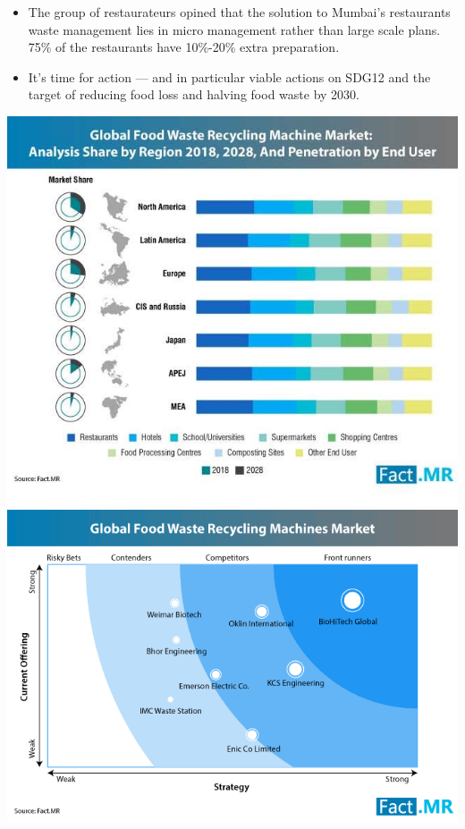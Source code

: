 \documentclass[11pt]{beamer}
\begin{document}
\begin{frame}
	\begin{itemize}
	\item The group of restaurateurs opined that the solution to Mumbai’s restaurants waste management lies in micro management rather than large scale plans. 75\% of the restaurants have 10\%-20\% extra preparation.
	\item It’s time for action — and in particular viable actions on SDG12 and the target of reducing food loss and halving food waste by 2030.
\end{itemize}
\includegraphics[height=0.45\textheight]{market.jpg}
\includegraphics[width=0.65\textheight]{market1.png}
	\end{frame}
\end{document}
